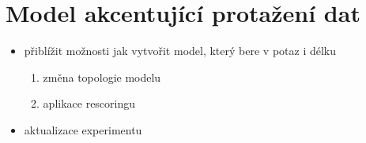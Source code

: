\section{Model akcentující protažení dat}
\label{chap:realisation:durationmodels}

\begin{itemize}
  \item přiblížit možnosti jak vytvořit model, který bere v potaz i délku
  \begin{enumerate}
    \item změna topologie modelu
    \item aplikace rescoringu
  \end{enumerate}
  \item aktualizace experimentu 
\end{itemize}
